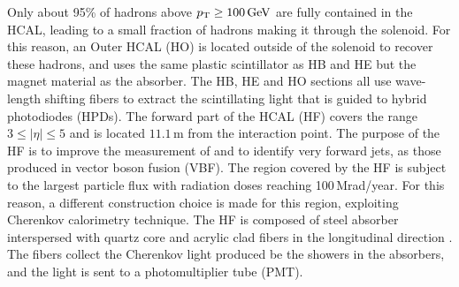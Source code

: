 Only about 95\% of hadrons above $p_{\mathrm{T}}\geq100\,\text{Ge\hspace{-.08em}V}$ are fully contained in the HCAL, leading to a small fraction of hadrons making it through the solenoid. 
For this reason, an Outer HCAL (HO) is located outside of the solenoid to recover these hadrons, and uses the same plastic scintillator as HB and HE but the magnet material as the absorber. 
The HB, HE and HO sections all use wave-length shifting fibers to extract the scintillating light that is guided to hybrid photodiodes (HPDs).  
\newpara
\noindent\justify
The forward part of the HCAL (HF) covers the range $3\leq|\eta|\leq5$ and is located $11.1\,$m from the interaction point. 
The purpose of the HF is to improve the measurement of \ptmiss and to identify very forward jets, as those produced in vector boson fusion (VBF). 
The region covered by the HF is subject to the largest particle flux with radiation doses reaching 100$\,$Mrad/year. 
For this reason, a different construction choice is made for this region, exploiting Cherenkov calorimetry technique. 
The HF is composed of steel absorber interspersed with quartz core and acrylic clad fibers in the longitudinal direction \cite{CERN-LHCC-97-031}.
The fibers collect the Cherenkov light produced be the showers in the absorbers, and the light is sent to a photomultiplier tube (PMT).    
